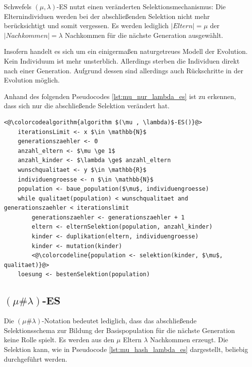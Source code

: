 Schwefels $(\mu, \lambda)$-ES nutzt einen veränderten Selektionsmechanismus:
Die Elternindividuen werden bei der abschließenden Selektion nicht mehr berücksichtigt und somit vergessen. Es werden lediglich $|Eltern| = \mu$ der $|Nachkommen| = \lambda$ Nachkommen für die nächste Generation ausgewählt.

Insofern handelt es sich um ein einigermaßen naturgetreues Modell der Evolution. Kein Individuum ist mehr unsterblich. Allerdings sterben die Individuen direkt nach einer Generation. Aufgrund dessen sind allerdings auch Rückschritte in der Evolution möglich.

Anhand des folgenden Pseudocodes \ref{lst:mu_nur_lambda_es} ist zu erkennen, dass sich nur die abschließende Selektion verändert hat.

\begin{lstlisting}[caption={$(\mu, \lambda)$-Evolutionsstrategie}, firstnumber=1, captionpos=b, label=lst:mu_nur_lambda_es]
<@\colorcodealgorithm{algorithm $(\mu , \lambda)$-ES()}@>
	iterationsLimit <- x $\in \mathbb{N}$
	generationszaehler <- 0
	anzahl_eltern <- $\mu \ge 1$
	anzahl_kinder <- $\lambda \ge$ anzahl_eltern
	wunschqualitaet <- y $\in \mathbb{R}$
	individuengroesse <- n $\in \mathbb{N}$
	population <- baue_population($\mu$, individuengroesse)
	while qualitaet(population) < wunschqualitaet and generationszaehler < iterationslimit
		generationszaehler <- generationszaehler + 1
		eltern <- elternSelektion(population, anzahl_kinder)
		kinder <- duplikation(eltern, individuengroesse)
		kinder <- mutation(kinder)
		<@\colorcodeline{population <- selektion(kinder, $\mu$, qualitaet)}@>
	loesung <- bestenSelektion(population)
\end{lstlisting}

\subsection{$(\mu \# \lambda)$-ES}

Die $(\mu \# \lambda)$-Notation bedeutet lediglich, dass das abschließende Selektionsschema zur Bildung der Basispopulation für die nächste Generation keine Rolle spielt.
Es werden aus den $\mu$ Eltern $\lambda$ Nachkommen erzeugt. Die Selektion kann, wie in Pseudocode \ref{lst:mu_hash_lambda_es} dargestellt, beliebig durchgeführt werden.

